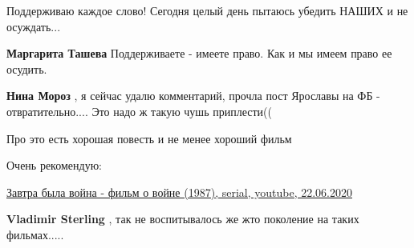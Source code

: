 \begin{itemize}
 
Поддерживаю каждое слово! Сегодня целый день пытаюсь убедить НАШИХ и не осуждать...

\begin{itemize}
 
\textbf{Маргарита Ташева} Поддерживаете - имеете право. Как и мы имеем право ее осудить.

 
\textbf{Нина Мороз} , я сейчас удалю комментарий, прочла пост Ярославы на ФБ - отвратительно.... Это надо ж такую чушь приплести((
\end{itemize}

 
Про это есть хорошая повесть и не менее хороший фильм

Очень рекомендую:

\href{https://www.youtube.com/watch?v=N2yxJYAiDHk}{%
Завтра была война - фильм о войне (1987), serial, youtube, 22.06.2020%
}

\begin{itemize}
 
\textbf{Vladimir Sterling} , так не воспитывалось же жто поколение на таких фильмах.....
\end{itemize}


\end{itemize}

